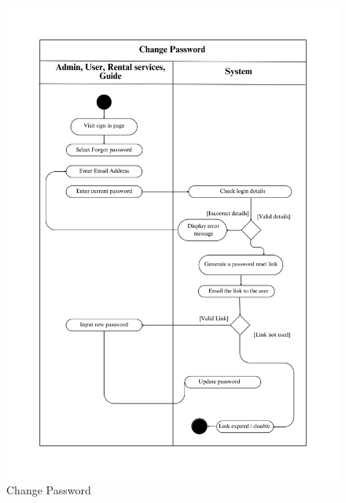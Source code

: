\begin{figure}[h]
    \centering
    \includegraphics[width=1\textwidth]{Images/Activity Diagrams/3 Change Password.png}
    \caption{Change Password}
    \label{fig:activity-change-password}
\end{figure}


